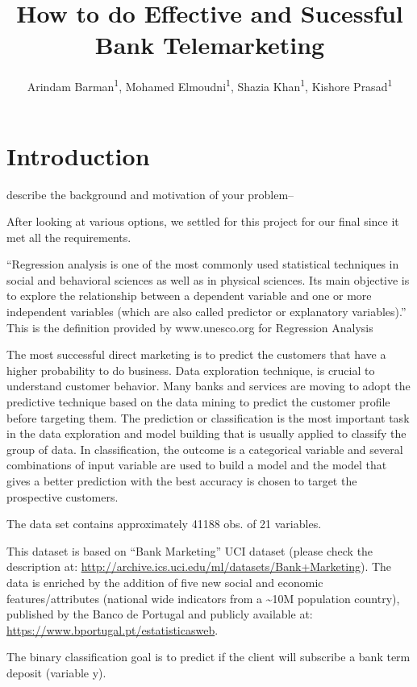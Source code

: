 \documentclass[english,floatsintext,man]{apa6}
\title{How to do Effective and Sucessful Bank Telemarketing}
\author{
          Arindam Barman\textsuperscript{1},
          Mohamed Elmoudni\textsuperscript{1},
          Shazia Khan\textsuperscript{1},
          Kishore Prasad\textsuperscript{1}  }
\affiliation{
    \vspace{0.5cm}
          \textsuperscript{1} City University of New York (CUNY)  }
\begin{document}
\maketitle



\section{Introduction}\label{introduction}

describe the background and motivation of your problem--

After looking at various options, we settled for this project for our
final since it met all the requirements.

\enquote{Regression analysis is one of the most commonly used
statistical techniques in social and behavioral sciences as well as in
physical sciences. Its main objective is to explore the relationship
between a dependent variable and one or more independent variables
(which are also called predictor or explanatory variables).} This is the
definition provided by www.unesco.org for Regression Analysis

The most successful direct marketing is to predict the customers that
have a higher probability to do business. Data exploration technique, is
crucial to understand customer behavior. Many banks and services are
moving to adopt the predictive technique based on the data mining to
predict the customer profile before targeting them. The prediction or
classification is the most important task in the data exploration and
model building that is usually applied to classify the group of data. In
classification, the outcome is a categorical variable and several
combinations of input variable are used to build a model and the model
that gives a better prediction with the best accuracy is chosen to
target the prospective customers.

The data set contains approximately 41188 obs. of 21 variables.

This dataset is based on \enquote{Bank Marketing} UCI dataset (please
check the description at:
\url{http://archive.ics.uci.edu/ml/datasets/Bank+Marketing}). The data
is enriched by the addition of five new social and economic
features/attributes (national wide indicators from a
\textasciitilde{}10M population country), published by the Banco de
Portugal and publicly available at:
\url{https://www.bportugal.pt/estatisticasweb}.

The binary classification goal is to predict if the client will
subscribe a bank term deposit (variable y).
\end{document}
